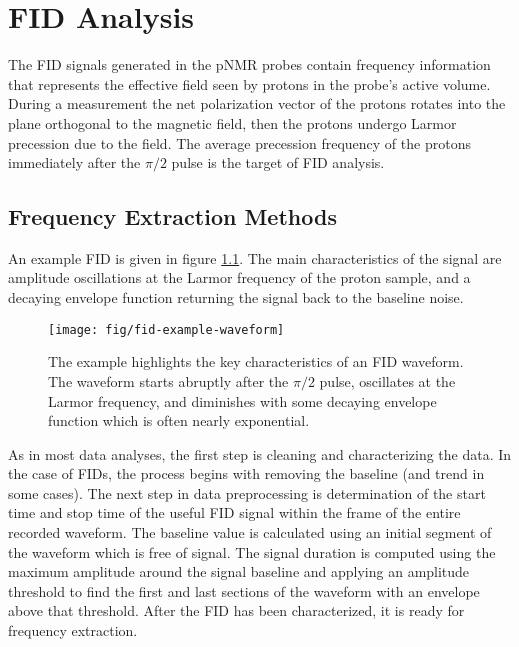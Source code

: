 \chapter{FID Analysis} \label{ch:fid-analysis}

The FID signals generated in the pNMR probes contain frequency information that represents the effective field seen by protons in the probe's active volume.  During a measurement the net polarization vector of the protons rotates into the plane orthogonal to the magnetic field, then the protons undergo Larmor precession due to the field.  The average precession frequency of the protons immediately after the $\pi/2$ pulse is the target of FID analysis.

\section{Frequency Extraction Methods}

An example FID is given in figure \ref{fig:fid-example-waveform}.  The main characteristics of the signal are amplitude oscillations at the Larmor frequency of the proton sample, and a decaying envelope function returning the signal back to the baseline noise.

\begin{figure}
\centering
\texttt{[image: fig/fid-example-waveform]}
\caption{
    The example highlights the key characteristics of an FID waveform.  The waveform starts abruptly after the $\pi/2$ pulse, oscillates at the Larmor frequency, and diminishes with some decaying envelope function which is often nearly exponential.
    \label{fig:fid-example-waveform}
}
\end{figure}

\noindent
As in most data analyses, the first step is cleaning and characterizing the data.  In the case of FIDs, the process begins with removing the baseline (and trend in some cases).  The next step in data preprocessing is determination of the start time and stop time of the useful FID signal within the frame of the entire recorded waveform.  The baseline value is calculated using an initial segment of the waveform which is free of signal.  The signal duration is computed using the maximum amplitude around the signal baseline and applying an amplitude threshold to find the first and last sections of the waveform with an envelope above that threshold.  After the FID has been characterized, it is ready for frequency extraction.



